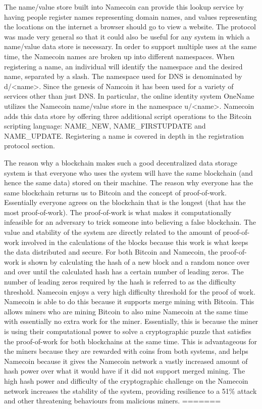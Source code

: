 The name/value store built into Namecoin can provide this lookup service by having people register names representing domain names, and values representing the locations on the internet a browser should go to view a website. The protocol was made very general so that it could also be useful for any system in which a name/value data store is necessary. In order to support multiple uses at the same time, the Namecoin names are broken up into different namespaces. When registering a name, an individual will identify the namespace and the desired name, separated by a slash. The namespace used for DNS is denominated by d/<name>. Since the genesis of Namcoin it has been used for a variety of services other than just DNS. In particular, the online identity system OneName utilizes the Namecoin name/value store in the namespace u/<name>. Namecoin adds this data store by offering three additional script operations to the Bitcoin scripting language: NAME\_NEW, NAME\_FIRSTUPDATE and NAME\_UPDATE. Registering a name is covered in depth in the registration protocol section. 

The reason  why a blockchain makes such a good decentralized data storage system is that everyone who uses the system will have the same blockchain (and hence the same data) stored on their machine. The reason why everyone has the same blockchain returns us to Bitcoin and the concept of proof-of-work. Essentially everyone agrees on the blockchain that is the longest (that has the most proof-of-work). The proof-of-work is what makes it computationally infeasible for an adversary to trick someone into believing a false blockchain. The value and stability of the system are directly related to the amount of proof-of-work involved in the calculations of the blocks because this work is what keeps the data distributed and secure. For both Bitcoin and Namecoin, the proof-of-work is shown by calculating the hash of a new block and a random nonce over and over until the calculated hash has a certain number of leading zeros. The number of leading zeros required by the hash is referred to as the difficulty threshold. 
    Namecoin enjoys a very high difficulty threshold for the proof of work. Namecoin is able to do this because it supports merge mining with Bitcoin. This allows miners who are mining Bitcoin to also mine Namecoin at the same time with essentially no extra work for the miner. Essentially, this is because the miner is using their computational power to solve a cryptographic puzzle that satisfies the proof-of-work for both blockchains at the same time. This is advantageous for the miners because they are rewarded with coins from both systems, and helps Namecoin because it gives the Namecoin network a vastly increased amount of hash power over what it would have if it did not support merged mining. The high hash power and difficulty of the cryptographic challenge on the Namecoin network increases the stability of the system, providing resilience to a 51\% attack and other threatening behaviours from malicious miners. 
=======

